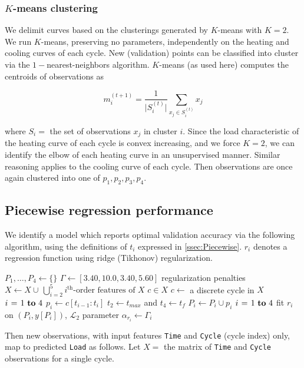 \documentclass[letterpaper, 10 pt, conference]{ieeeconf}  %
\begin{document}
\subsubsection{$K$-means clustering}
We delimit curves based on the clusterings generated by $K$-means with $K=2$.  We run $K$-means, preserving no parameters, independently on the heating and cooling curves of each cycle. New (validation) points can be classified into cluster via the $1-$nearest-neighbors algorithm. $K$-means (as used here) computes the centroids of observations as

$$
m_i^{(t+1)} = \frac{1}{\vert S_i^{(t)} \vert} \sum_{x_j \in S_i^{(t)}} x_j
$$

where $S_i =$ the set of observations $x_j$ in cluster $i$. Since the load characteristic of the heating curve of each cycle is convex increasing, and we force $K=2$, we can identify the elbow of each heating curve in an unsupervised manner. Similar reasoning applies to the cooling curve of each cycle. Then observations are once again clustered into one of $p_1, p_2, p_3, p_4$.

\subsection{Piecewise regression performance}
We identify a model which reports optimal validation accuracy via the following algorithm, using the definitions of $t_i$ expressed in \ref{ssec:Piecewise}. $r_i$ denotes a regression function using ridge (Tikhonov) regularization.
\begin{codebox}
  \li $P_1, \dots , P_4 \gets \{\}$
  \li $\Gamma \gets [3.40, 10.0, 3.40, 5.60]$ \hspace{3pt} \Comment regularization penalties
  \li $X \gets X \cup \, \bigcup_{i=2}^5 i^{\text{th}}\text{-order features of }X$
  \li \For $c \in X$ \hspace{60pt} \Comment $c \gets $ a discrete cycle in $X$ \Do
    \li \For $i \gets 1 \To 4$ \Do
      \li $p_i \gets c[t_{i-1}:t_i]$ \Comment $t_2 \gets t_{max}$ and $t_4 \gets t_f$
      \li $P_i \gets P_i \cup p_i$
    \End
  \End
  \li \For $i \gets 1 \To 4$ \Do
    \li fit $r_i$ on $(P_i, y[P_i])$, $\mathcal{L}_2$ parameter $\alpha_{r_i} \gets \Gamma_i$
  \End
\end{codebox}

Then new observations, with input features \verb|Time| and \verb|Cycle| (cycle index) only, map to predicted \verb|Load| as follows. Let $X=$ the matrix of \verb|Time| and \verb|Cycle| observations for a single cycle.
\end{document}
